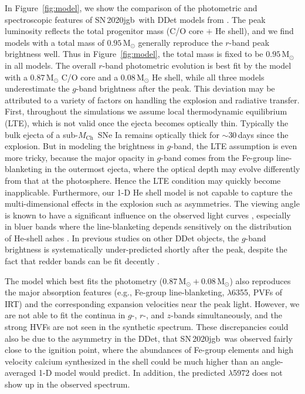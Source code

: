 \documentclass[twocolumn]{aastex631}
\newcommand{\sn}{SN\,2020jgb}
\newcommand{\Mch}{$M_\mathrm{Ch}$}
\begin{document}
In Figure~\ref{fig:model}, we show the comparison of the photometric and spectroscopic features of \sn\ with DDet models from \citet{polin_observational_2019}. The peak luminosity reflects the total progenitor mass (C/O core $+$ He shell), and we find models with a total mass of $0.95\,\mathrm{M_\odot}$ generally reproduce the $r$-band peak brightness well. Thus in Figure~\ref{fig:model}, the total mass is fixed to be $0.95\,\mathrm{M_\odot}$ in all models. The overall $r$-band photometric evolution is best fit by the model with a $0.87\,\mathrm{M_\odot}$ C/O core and a $0.08\,\mathrm{M_\odot}$ He shell, while all three models underestimate the $g$-band brightness after the peak. This deviation may be attributed to a variety of factors on handling the explosion and radiative transfer. First, throughout the simulations we assume local thermodynamic equilibrium (LTE), which is not valid once the ejecta becomes optically thin. Typically the bulk ejecta of a sub-\Mch\ SNe Ia remains optically thick for $\sim$30\,days since the explosion. But in modeling the brightness in $g$-band, the LTE assumption is even more tricky, because the major opacity in $g$-band comes from the Fe-group line-blanketing in the outermost ejecta, where the optical depth may evolve differently from that at the photosphere. Hence the LTE condition may quickly become inapplicable. Furthermore, our 1-D He shell model is not capable to capture the multi-dimensional effects in the explosion such as asymmetries. The viewing angle is known to have a significant influence on the observed light curves \citep{Kromer_DD_2010, Sim_2012, Gronow_2020, Shen_2D_2021}, especially in bluer bands where the line-blanketing depends sensitively on the distribution of He-shell ashes \citep{Shen_2D_2021}. In previous studies on other DDet objects, the $g$-band brightness is systematically under-predicted shortly after the peak, despite the fact that redder bands can be fit decently \citep[e.g.][]{jiang_16jhr_2017,jacobson-galan_16hnk_2020}.

The model which best fits the photometry ($0.87\,\mathrm{M_\odot}+0.08\,\mathrm{M_\odot}$) also reproduces the major absorption features (e.g., Fe-group line-blanketing,  $\lambda$6355, PVFs of  IRT) and the corresponding expansion velocities near the peak light. 
However, we are not able to fit the continua in $g$-, $r$-, and $z$-bands simultaneously, and the strong  HVFs are not seen in the synthetic spectrum. These discrepancies could also be due to the asymmetry in the DDet, that \sn\ was observed fairly close to the ignition point, where the abundances of Fe-group elements and high velocity calcium synthesized in the shell could be much higher than an angle-averaged 1-D model would predict.
In addition, the predicted  $\lambda$5972 does not show up in the observed spectrum.
\end{document}
